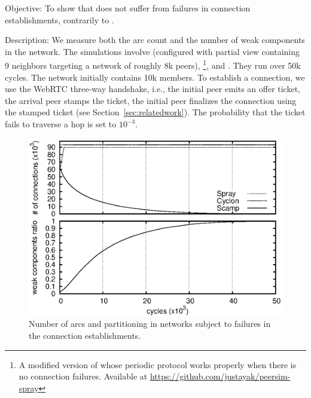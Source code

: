 \begin{asparadesc}
\item[Objective:] To show that \SPRAY does not suffer from failures in
  connection establishments, contrarily to \SCAMP.
\item[Description:] We measure both the arc count and the number of weak
  components in the network. The simulations involve \CYCLON (configured with
  partial view containing 9 neighbors targeting a network of roughly 8k
  peers), \SCAMP\footnote{A modified version of \SCAMP whose periodic protocol
    works properly when there is no connection failures. Available at
    \url{https://github.com/justayak/peersim-spray}}, and \SPRAY. They run over
  50k cycles. The network initially contains 10k members.  To establish a
  connection, we use the WebRTC three-way handshake, i.e., the initial peer
  emits an offer ticket, the arrival peer stamps the ticket, the initial peer
  finalizes the connection using the stamped ticket
  (see Section~\ref{sec:relatedwork}). The probability that the ticket fails to
  traverse a hop is set to $10^{-3}$.

\begin{figure}
  \centering \includegraphics[width=\SCALE\textwidth]{img/degen.eps}
  \caption{\label{fig:degeneration}Number of arcs and partitioning in networks
    subject to failures in the connection establishments.}
\end{figure}


\end{asparadesc}
